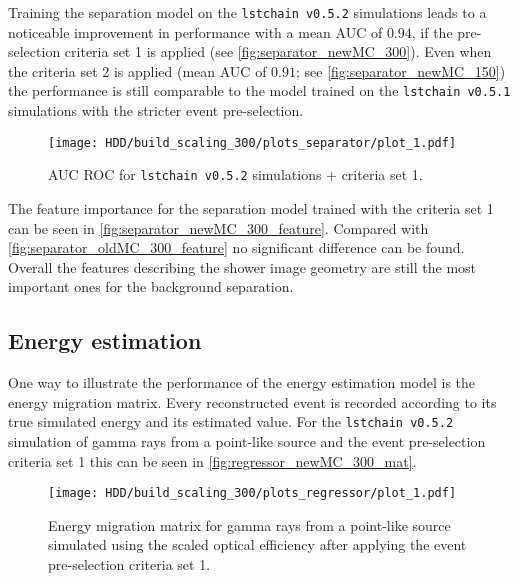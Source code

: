 Training the separation model on the \texttt{lstchain v0.5.2} simulations leads to a noticeable improvement in performance with a mean AUC of $\num{0.94}$, 
if the pre-selection criteria set 1 is applied (see \autoref{fig:separator_newMC_300}). 
Even when the criteria set 2 is applied (mean AUC of $\num{0.91}$; see \autoref{fig:separator_newMC_150}) 
the performance is still comparable to the model trained on the \texttt{lstchain v0.5.1} simulations with the stricter event pre-selection.
\begin{figure}
    \centering
    \texttt{[image: HDD/build\_scaling\_300/plots\_separator/plot\_1.pdf]}
    \caption{AUC ROC for \texttt{lstchain v0.5.2} simulations + criteria set 1.}
    \label{fig:separator_newMC_300}
\end{figure}

The feature importance for the separation model trained with the criteria set 1 can be seen in \autoref{fig:separator_newMC_300_feature}.
Compared with \autoref{fig:separator_oldMC_300_feature} no significant difference can be found.
Overall the features describing the shower image geometry are still the most important ones for the background separation.


\subsection{Energy estimation}
One way to illustrate the performance of the energy estimation model is the energy migration matrix.
Every reconstructed event is recorded according to its true simulated energy and its estimated value.
For the \texttt{lstchain v0.5.2} simulation of gamma rays from a point-like source and the event pre-selection criteria set 1 this can be seen in 
\autoref{fig:regressor_newMC_300_mat}.
\begin{figure}
    \centering
    \texttt{[image: HDD/build\_scaling\_300/plots\_regressor/plot\_1.pdf]}
    \caption{Energy migration matrix for gamma rays from a point-like source simulated using the scaled optical efficiency after applying the 
        event pre-selection criteria set 1.
    }
    \label{fig:regressor_newMC_300_mat}
\end{figure}


